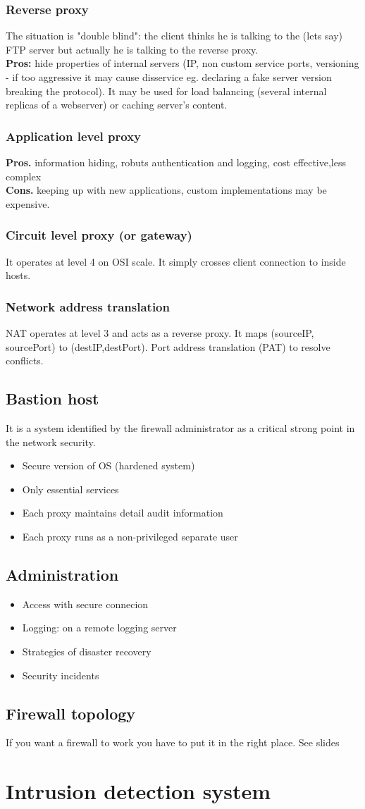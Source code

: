 \documentclass[10pt,a4paper]{book}
\begin{document}
\subsection{Reverse proxy}
The situation is "double blind": the client thinks he is talking to the (lets say) FTP server but actually he is talking to the reverse proxy.\\
\textbf{Pros:} hide properties of internal servers (IP, non custom service ports, versioning - if too aggressive it may cause disservice eg. declaring a fake server version breaking the protocol). It may be used for load balancing (several internal replicas of a webserver) or caching server's content.
\subsection{Application level proxy}
\textbf{Pros.} information hiding, robuts authentication and logging, cost effective,less complex\\
\textbf{Cons.} keeping up with new applications, custom implementations may be expensive.
\subsection{Circuit level proxy (or gateway)}
It operates at level 4 on OSI scale. It simply crosses client connection to inside hosts.
\subsection{Network address translation}
NAT operates at level 3 and acts as a reverse proxy. It maps (sourceIP, sourcePort) to (destIP,destPort). Port address translation (PAT) to resolve conflicts.
\section{Bastion host}
It is a system identified by the firewall administrator as a critical strong point in the network security.
\begin{itemize}
\item Secure version of OS (hardened system)
\item Only essential services
\item Each proxy maintains detail audit information
\item Each proxy runs as a non-privileged separate user
\end{itemize}
\section{Administration}
\begin{itemize}
\item Access with secure connecion
\item Logging: on a remote logging server
\item Strategies of disaster recovery
\item Security incidents
\end{itemize}
\section{Firewall topology}
If you want a firewall to work you have to put it in the right place.
See slides
\chapter{Intrusion detection system}
\end{document}
